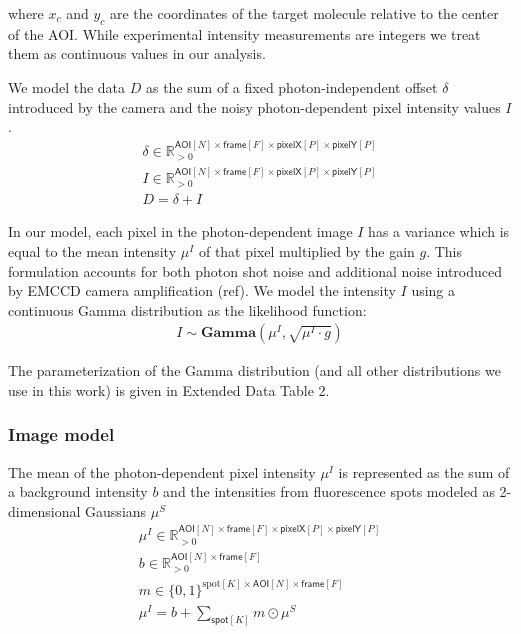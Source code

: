 \noindent
where $x_c$ and $y_c$ are the coordinates of the target molecule relative to the center of the AOI. While experimental intensity measurements are integers we treat them as continuous values in our analysis.

We model the data $D$ as the sum of a fixed photon-independent offset $\delta$ introduced by the camera and the noisy photon-dependent pixel intensity values $I$.
%
\begin{gather*}
    \delta \in \mathbb{R}_{>0}^{\mathsf{AOI}[N] \times \mathsf{frame}[F] \times \mathsf{pixelX}[P] \times \mathsf{pixelY}[P]} \\
    I \in \mathbb{R}_{>0}^{\mathsf{AOI}[N] \times \mathsf{frame}[F] \times \mathsf{pixelX}[P] \times \mathsf{pixelY}[P]} \\ 
    D = \delta + I
\end{gather*}

In our model, each pixel in the photon-dependent image $I$ has a  variance which is equal to  the mean intensity $\mu^I$ of that pixel multiplied by the gain $g$. This formulation accounts for both photon shot noise and additional noise introduced by EMCCD camera amplification (ref). We model the intensity $I$ using a continuous Gamma distribution as the likelihood function:
%
\begin{gather*}
    I \sim \mathbf{Gamma} (\mu^I, \sqrt{\mu^I \cdot g})
\end{gather*}

The parameterization of the Gamma distribution (and all other distributions we use in this work) is given in Extended Data Table 2.

\subsubsection*{Image model}

The mean of the photon-dependent pixel intensity $\mu^I$ is represented  as the sum of a background intensity $b$ and the intensities from fluorescence spots modeled as  2-dimensional Gaussians $\mu^S$ 
%
\begin{gather*}
    \mu^I \in \mathbb{R}_{>0}^{\mathsf{AOI}[N] \times \mathsf{frame}[F] \times \mathsf{pixelX}[P] \times \mathsf{pixelY}[P]} \\
    b \in \mathbb{R}_{>0}^{\mathsf{AOI}[N] \times \mathsf{frame}[F]} \\
    m \in \{ 0, 1 \}^{\mathrm{spot}[K] \times \mathsf{AOI}[N] \times \mathsf{frame}[F] } \\
    \mu^I = b + \sum_{\mathsf{spot}[K]} m \odot{} \mu^S \\
\end{gather*}

